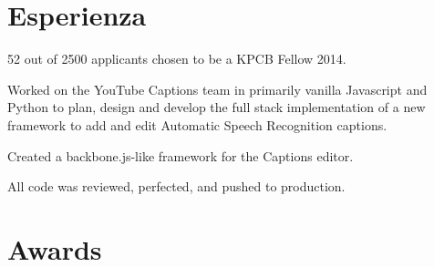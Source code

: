 \documentclass[a4paper]{deedy-resume} %
\begin{document}
\hfill
%
%
\begin{minipage}[t]{0.66\textwidth} %


\section{Esperienza}


\vspace{\topsep} %
\begin{tightitemize}
\item 52 out of 2500 applicants chosen to be a KPCB Fellow 2014.
\end{tightitemize}

\sectionspace %



\begin{tightitemize}
\item Worked on the YouTube Captions team in primarily vanilla Javascript and Python to plan, design and develop the full stack implementation of a new framework to add and edit Automatic Speech Recognition captions.
\item Created a backbone.js-like framework for the Captions editor.
\item All code was reviewed, perfected, and pushed to production.
\end{tightitemize}

\sectionspace %


\section{Awards} 


\end{minipage}
\end{document}
